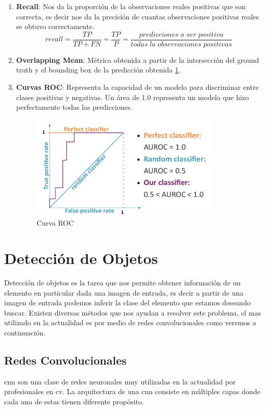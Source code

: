 \begin{enumerate}
\item \textbf{Recall}: Nos da la proporción de la observaciones reales positivas que son correcta, es decir nos da la precisión de cuantas observaciones positivas reales se obtuvo correctamente.
\begin{equation}
recall = \frac{TP}{TP+FN} = \frac{TP}{P} = \frac{predicciones\;a\;ser\;positiva}{todas\;la\;observaciones\;positivas} 
\end{equation}

\item \textbf{Overlapping Mean}: Métrica obtenida a partir de la intersección del ground truth y el bounding box de la predicción obtenida \ref{Fig: roc}.

\item \textbf{Curvas ROC}: Representa la capacidad de un modelo para discriminar entre clases positivas y negativas. Un área de 1.0 representa un modelo que hizo perfectamente todas las predicciones.
\begin{figure}[H]
 \centering
  \includegraphics[height=5cm,keepaspectratio=true,clip=true]{imagenes/MarcoTeorico/curvas-roc.png}
  \caption{Curva ROC}
	\label{Fig: roc}
\end{figure}


\end{enumerate}


\section{Detección de Objetos}\label{sec:compueter-vision}

Detección de objetos es la tarea que nos permite obtener información de un elemento en particular dada una imagen de entrada, es decir a partir de una imagen de entrada podemos inferir la clase del elemento que estamos deseando buscar. Existen diversas métodos que nos ayudan a resolver este problema, el mas utilizado en la actualidad es por medio de redes convolucionales como veremos a continuación.

\subsection{Redes Convolucionales}\label{sub:cnn}
\ac{cnn} son una clase de redes neuronales muy utilizadas en la actualidad por profesionales en \ac{cv}. La arquitectura de una \ac{cnn} consiste en múltiples capas donde cada una de estas tienen diferente propósito.

